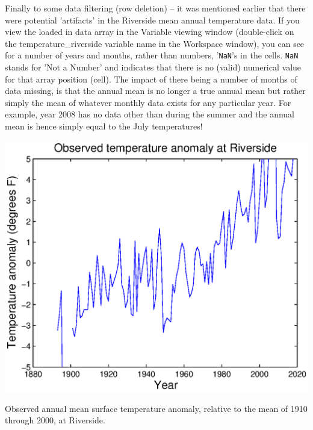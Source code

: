 \documentclass{tufte-book} %
\begin{document}
\noindent Finally to some data filtering (row deletion) -- it was mentioned earlier that there were potential 'artifacts' in the Riverside mean annual temperature data. If you view the loaded in data array in the \textsf{Variable viewing window} (double-click on the \textsf{temperature\_riverside} variable name in the \textsf{Workspace window}), you can see for a number of years and months, rather than numbers, '\texttt{NaN}'s in the cells. \texttt{NaN} stands for 'Not a Number' and indicates that there is no (valid) numerical value for that array position (cell). The impact of there being a number of months of data missing, is that the annual mean is no longer a true annual mean but rather simply the mean of whatever monthly data exists for any particular year. For example, year 2008 has no data other than during the summer and the annual mean is hence simply equal to the July temperatures!

\begin{marginfigure}[0.0in]
\includegraphics[width=\linewidth]{ch1-plot-temperature6.eps}
\caption{Observed annual mean surface temperature anomaly, relative to the mean of 1910 through 2000, at Riverside.}
\label{fig:ch1-plot-temperature6}
\end{marginfigure}
\end{document}
